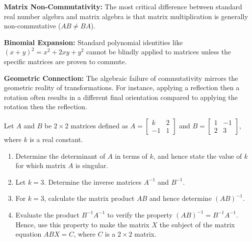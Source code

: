 \begin{takeaways}
\item \textbf{Matrix Non-Commutativity:} The most critical difference between standard real number algebra and matrix algebra is that matrix multiplication is generally non-commutative ($AB \neq BA$).
\item \textbf{Binomial Expansion:} Standard polynomial identities like $(x+y)^2 = x^2+2xy+y^2$ cannot be blindly applied to matrices unless the specific matrices are proven to commute.
\item \textbf{Geometric Connection:} The algebraic failure of commutativity mirrors the geometric reality of transformations. For instance, applying a reflection then a rotation often results in a different final orientation compared to applying the rotation then the reflection.
\end{takeaways}

\begin{problem}
Let $A$ and $B$ be $2 \times 2$ matrices defined as $A = \begin{bmatrix} k & 2 \\ -1 & 1 \end{bmatrix}$ and $B = \begin{bmatrix} 1 & -1 \\ 2 & 3 \end{bmatrix}$, where $k$ is a real constant.

\begin{enumerate}[label=\textbf{(\alph*)}]
    \item Determine the determinant of $A$ in terms of $k$, and hence state the value of $k$ for which matrix $A$ is singular.
    \item Let $k = 3$. Determine the inverse matrices $A^{-1}$ and $B^{-1}$.
    \item For $k = 3$, calculate the matrix product $AB$ and hence determine $(AB)^{-1}$.
    \item Evaluate the product $B^{-1}A^{-1}$ to verify the property $(AB)^{-1} = B^{-1}A^{-1}$. Hence, use this property to make the matrix $X$ the subject of the matrix equation $ABX = C$, where $C$ is a $2 \times 2$ matrix.
\end{enumerate}
\end{problem}

